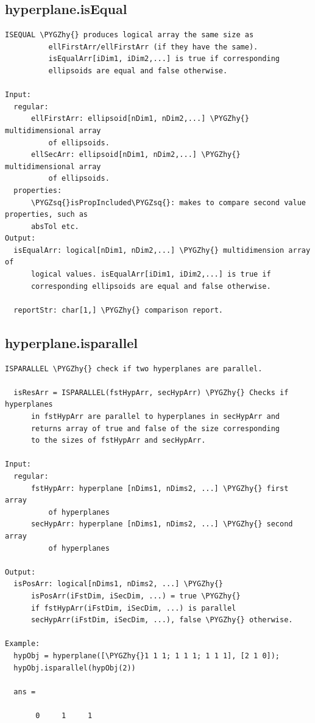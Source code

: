 \documentclass[letterpaper,10pt,english]{sphinxmanual}
\def\PYGZhy{\char`\-}
\def\PYGZsq{\char`\'}
\begin{document}
\subsection{hyperplane.isEqual}
\label{chap_functions:hyperplane-isequal}
\begin{Verbatim}[commandchars=\\\{\}]
ISEQUAL \PYGZhy{} produces logical array the same size as
          ellFirstArr/ellFirstArr (if they have the same).
          isEqualArr[iDim1, iDim2,...] is true if corresponding
          ellipsoids are equal and false otherwise.

Input:
  regular:
      ellFirstArr: ellipsoid[nDim1, nDim2,...] \PYGZhy{} multidimensional array
          of ellipsoids.
      ellSecArr: ellipsoid[nDim1, nDim2,...] \PYGZhy{} multidimensional array
          of ellipsoids.
  properties:
      \PYGZsq{}isPropIncluded\PYGZsq{}: makes to compare second value properties, such as
      absTol etc.
Output:
  isEqualArr: logical[nDim1, nDim2,...] \PYGZhy{} multidimension array of
      logical values. isEqualArr[iDim1, iDim2,...] is true if
      corresponding ellipsoids are equal and false otherwise.

  reportStr: char[1,] \PYGZhy{} comparison report.
\end{Verbatim}


\subsection{hyperplane.isparallel}
\label{chap_functions:hyperplane-isparallel}
\begin{Verbatim}[commandchars=\\\{\}]
ISPARALLEL \PYGZhy{} check if two hyperplanes are parallel.

  isResArr = ISPARALLEL(fstHypArr, secHypArr) \PYGZhy{} Checks if hyperplanes
      in fstHypArr are parallel to hyperplanes in secHypArr and
      returns array of true and false of the size corresponding
      to the sizes of fstHypArr and secHypArr.

Input:
  regular:
      fstHypArr: hyperplane [nDims1, nDims2, ...] \PYGZhy{} first array
          of hyperplanes
      secHypArr: hyperplane [nDims1, nDims2, ...] \PYGZhy{} second array
          of hyperplanes

Output:
  isPosArr: logical[nDims1, nDims2, ...] \PYGZhy{}
      isPosArr(iFstDim, iSecDim, ...) = true \PYGZhy{}
      if fstHypArr(iFstDim, iSecDim, ...) is parallel
      secHypArr(iFstDim, iSecDim, ...), false \PYGZhy{} otherwise.

Example:
  hypObj = hyperplane([\PYGZhy{}1 1 1; 1 1 1; 1 1 1], [2 1 0]);
  hypObj.isparallel(hypObj(2))

  ans =

       0     1     1
\end{Verbatim}
\end{document}
